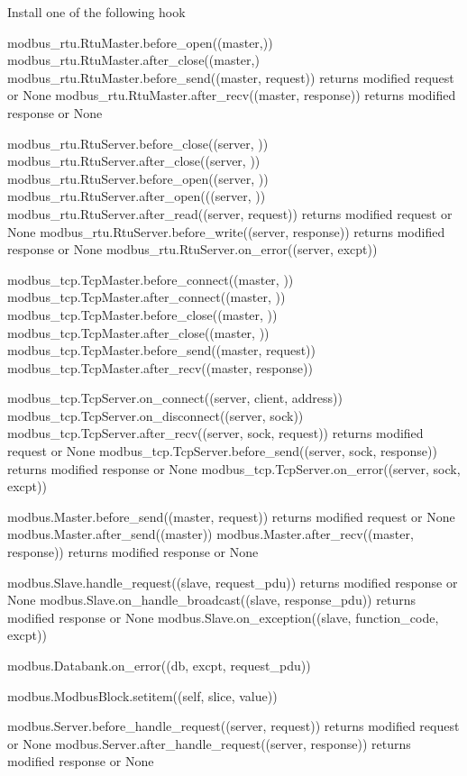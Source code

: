 \begin{DoxyVerb}Install one of the following hook

modbus_rtu.RtuMaster.before_open((master,))
modbus_rtu.RtuMaster.after_close((master,) 
modbus_rtu.RtuMaster.before_send((master, request)) returns modified request or None 
modbus_rtu.RtuMaster.after_recv((master, response)) returns modified response or None

modbus_rtu.RtuServer.before_close((server, ))  
modbus_rtu.RtuServer.after_close((server, ))  
modbus_rtu.RtuServer.before_open((server, ))  
modbus_rtu.RtuServer.after_open(((server, ))      
modbus_rtu.RtuServer.after_read((server, request)) returns modified request or None
modbus_rtu.RtuServer.before_write((server, response))  returns modified response or None 
modbus_rtu.RtuServer.on_error((server, excpt))

modbus_tcp.TcpMaster.before_connect((master, ))  
modbus_tcp.TcpMaster.after_connect((master, ))      
modbus_tcp.TcpMaster.before_close((master, ))  
modbus_tcp.TcpMaster.after_close((master, ))  
modbus_tcp.TcpMaster.before_send((master, request))  
modbus_tcp.TcpMaster.after_recv((master, response))  

modbus_tcp.TcpServer.on_connect((server, client, address))  
modbus_tcp.TcpServer.on_disconnect((server, sock))  
modbus_tcp.TcpServer.after_recv((server, sock, request)) returns modified request or None  
modbus_tcp.TcpServer.before_send((server, sock, response)) returns modified response or None
modbus_tcp.TcpServer.on_error((server, sock, excpt))  

modbus.Master.before_send((master, request)) returns modified request or None
modbus.Master.after_send((master))  
modbus.Master.after_recv((master, response)) returns modified response or None  

modbus.Slave.handle_request((slave, request_pdu)) returns modified response or None
modbus.Slave.on_handle_broadcast((slave, response_pdu)) returns modified response or None  
modbus.Slave.on_exception((slave, function_code, excpt))  

modbus.Databank.on_error((db, excpt, request_pdu))

modbus.ModbusBlock.setitem((self, slice, value))  

modbus.Server.before_handle_request((server, request)) returns modified request or None
modbus.Server.after_handle_request((server, response)) returns modified response or None
\end{DoxyVerb}
 

